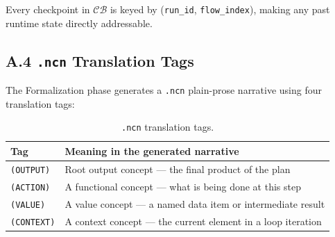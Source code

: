 Every checkpoint in $\mathcal{CB}$ is keyed by (\texttt{run\_id},
\texttt{flow\_index}), making any past runtime state directly addressable.

\subsection*{A.4 \texttt{.ncn} Translation Tags}

The Formalization phase generates a \texttt{.ncn} plain-prose narrative using four
translation tags:

\begin{table}[h]
\centering
\caption{\texttt{.ncn} translation tags.}
\label{tab:ncntags}
\begin{tabular}{@{}p{2.2cm}p{9.0cm}@{}}
\toprule
\textbf{Tag} & \textbf{Meaning in the generated narrative} \\
\midrule
\texttt{(OUTPUT)}  & Root output concept --- the final product of the plan \\
\texttt{(ACTION)}  & A functional concept --- what is being done at this step \\
\texttt{(VALUE)}   & A value concept --- a named data item or intermediate result \\
\texttt{(CONTEXT)} & A context concept --- the current element in a loop iteration \\
\bottomrule
\end{tabular}
\end{table}
